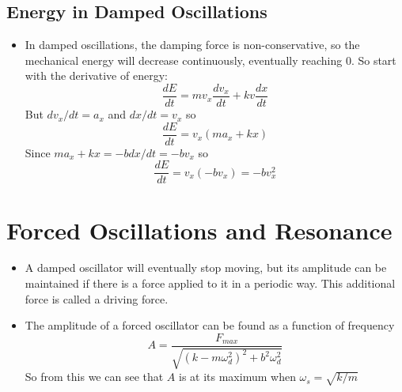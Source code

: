 \documentclass[11pt, a4paper]{article}
\begin{document}
\subsection{Energy in Damped Oscillations}
\begin{itemize}
    \item In damped oscillations, the damping force is non-conservative, so the mechanical energy will
        decrease continuously, eventually reaching 0. So start with the derivative of energy:
        \begin{equation}
            \frac{dE}{dt} = mv_{x}\frac{dv_{x}}{dt} + kv\frac{dx}{dt}
        \end{equation}
        But $dv_{x}/dt = a_{x}$ and $dx/dt = v_{x}$ so
        \begin{equation}
            \frac{dE}{dt} = v_{x}(ma_{x} + kx)
        \end{equation}
        Since $ma_{x} + kx = -bdx/dt = -bv_{x}$ so
        \begin{equation}
            \frac{dE}{dt} = v_{x}(-bv_{x}) = -bv_{x}^{2}
        \end{equation}
\end{itemize}
\section{Forced Oscillations and Resonance}
\begin{itemize}
    \item A damped oscillator will eventually stop moving, but its amplitude can be maintained
        if there is a force applied to it in a periodic way. This additional force is called a
        driving force.
    \item The amplitude of a forced oscillator can be found as a function of frequency
        \begin{equation}
            A = \frac{F_{max}}{\sqrt{(k-m\omega^{2}_{d})^{2} + b^{2}\omega_{d}^{2}}}
        \end{equation}
        So from this we can see that $A$ is at its maximum when $\omega_{s} = \sqrt{k/m}$
\end{itemize}
\end{document}
